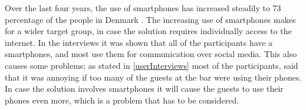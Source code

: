 Over the last four years, the use of smartphones has increased steadily to 73 percentage of the people in Denmark \cite{smartphone2014} . The increasing use of smartphones makes for a wider target group, in case the solution requires individually access to the internet.  In the interviews it was shown that all of the participants have a smartphones, and most use them for communication over social media. This also causes some problems; as stated in \cref{userInterviews} most of the participants, said that it was annoying if too many of the guests at the bar were using their phones. In case the solution involves smartphones it will cause the guests to use their phones even more, which is a problem that has to be considered.